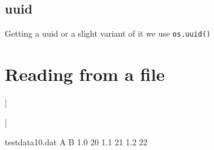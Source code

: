\subsection{uuid}
Getting a uuid or a slight variant of it we use \lstinline!os.uuid()!



\section{Reading from a file}

|\usepackage{luatextra}|


\begin{filecontents}{testdata10.dat}
  A  B
  1.0 20
  1.1 21
  1.2 22
\end{filecontents}
%
%
%












